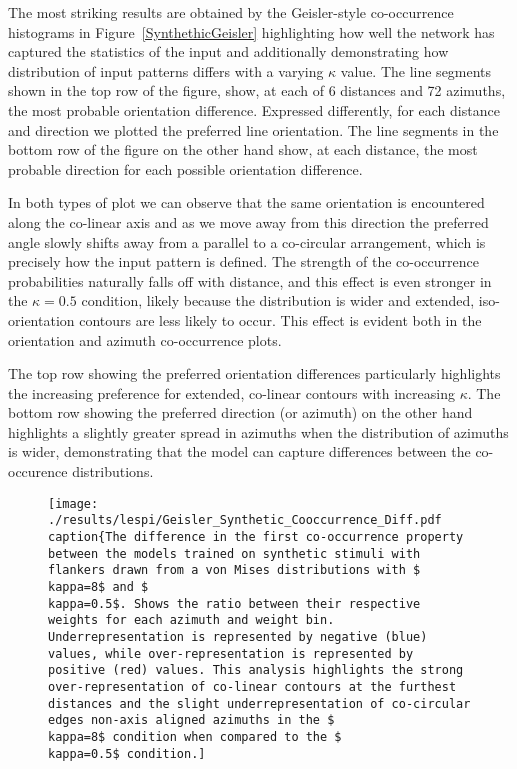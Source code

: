 The most striking results are obtained by the Geisler-style
co-occurrence histograms in Figure~\ref{SynthethicGeisler}
highlighting how well the network has captured the statistics of the
input and additionally demonstrating how distribution of input
patterns differs with a varying $\kappa$ value. The line segments
shown in the top row of the figure, show, at each of 6 distances and
72 azimuths, the most probable orientation difference. Expressed
differently, for each distance and direction we plotted the preferred
line orientation. The line segments in the bottom row of the figure on
the other hand show, at each distance, the most probable direction for
each possible orientation difference.

In both types of plot we can observe that the same orientation is
encountered along the co-linear axis and as we move away from this
direction the preferred angle slowly shifts away from a parallel to a
co-circular arrangement, which is precisely how the input pattern is
defined. The strength of the co-occurrence probabilities naturally
falls off with distance, and this effect is even stronger in the
$\kappa=0.5$ condition, likely because the distribution is wider and
extended, iso-orientation contours are less likely to occur. This
effect is evident both in the orientation and azimuth co-occurrence
plots.

The top row showing the preferred orientation differences particularly
highlights the increasing preference for extended, co-linear contours
with increasing $\kappa$. The bottom row showing the preferred
direction (or azimuth) on the other hand highlights a slightly greater
spread in azimuths when the distribution of azimuths is wider,
demonstrating that the model can capture differences between the
co-occurence distributions.

\begin{figure}
  \centering
  \texttt{[image: ./results/lespi/Geisler\_Synthetic\_Cooccurrence\_Diff.pdf
	\\caption\{The difference in the first co-occurrence property
      between the models trained on synthetic stimuli with flankers
      drawn from a von Mises distributions with \$\\kappa=8\$ and
      \$\\kappa=0.5\$. Shows the ratio between their respective weights
      for each azimuth and weight bin. Underrepresentation is
      represented by negative (blue) values, while over-representation
      is represented by positive (red) values. This analysis
      highlights the strong over-representation of co-linear contours
      at the furthest distances and the slight underrepresentation of
      co-circular edges non-axis aligned azimuths in the \$\\kappa=8\$
      condition when compared to the \$\\kappa=0.5\$ condition.]}
	\label{SyntheticGeislerDiff}
\end{figure}

